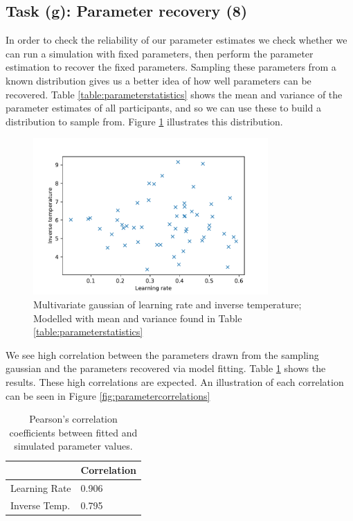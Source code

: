 \documentclass{article}
\begin{document}
\subsection{Task (g): Parameter recovery (8)}

In order to check the reliability of our parameter estimates we check whether we can run a simulation with fixed parameters, then perform the parameter estimation to recover the fixed parameters. Sampling these parameters from a known distribution gives us a better idea of how well parameters can be recovered. Table \ref{table:parameterstatistics} shows the mean and variance of the parameter estimates of all participants, and so we can use these to build a distribution to sample from. Figure \ref{fig:parametergaussian} illustrates this distribution.

\begin{figure}[H]
  \centering
  \includegraphics[width=0.8\textwidth]{figures/part2/task7/parametergaussian.pdf}
  \caption{\centering Multivariate gaussian of learning rate and inverse temperature; Modelled with mean and variance found in Table \ref{table:parameterstatistics}}
  \label{fig:parametergaussian}
\end{figure}

We see high correlation between the parameters drawn from the sampling gaussian and the parameters recovered via model fitting. Table \ref{table:recoveredcorrelation} shows the results. These high correlations are expected. An illustration of each correlation can be seen in Figure \ref{fig:parametercorrelations}

\begin{table}[H]
  \centering
  \begin{tabular}{@{}ll@{}}
    \toprule
                & Correlation \\ \midrule
  Learning Rate & 0.906       \\
  Inverse Temp. & 0.795       \\ \bottomrule
  \end{tabular}
  \caption{Pearson's correlation coefficients between fitted and simulated parameter values.}
  \label{table:recoveredcorrelation}
\end{table}
\end{document}
